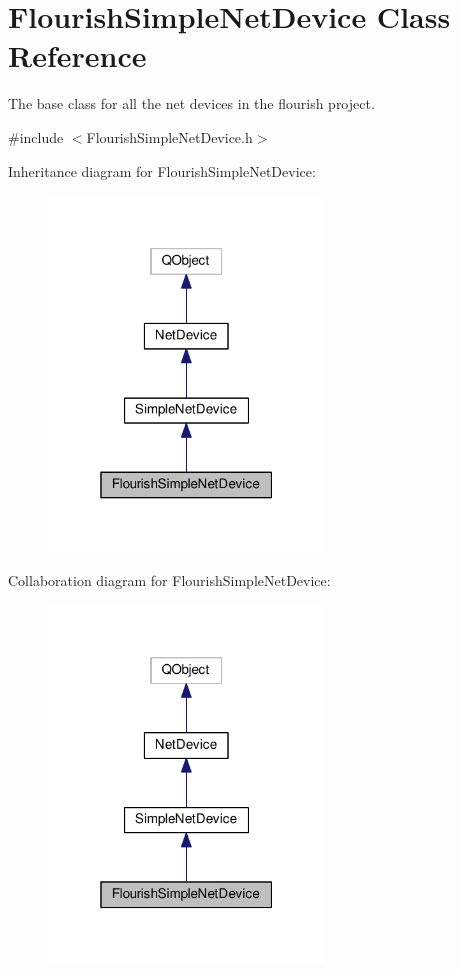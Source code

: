 \hypertarget{classFlourishSimpleNetDevice}{}\section{Flourish\+Simple\+Net\+Device Class Reference}
\label{classFlourishSimpleNetDevice}


The base class for all the net devices in the flourish project.  




{\ttfamily \#include $<$Flourish\+Simple\+Net\+Device.\+h$>$}



Inheritance diagram for Flourish\+Simple\+Net\+Device\+:\nopagebreak
\begin{figure}[H]
\begin{center}
\leavevmode
\includegraphics[width=208pt]{classFlourishSimpleNetDevice__inherit__graph}
\end{center}
\end{figure}


Collaboration diagram for Flourish\+Simple\+Net\+Device\+:\nopagebreak
\begin{figure}[H]
\begin{center}
\leavevmode
\includegraphics[width=208pt]{classFlourishSimpleNetDevice__coll__graph}
\end{center}
\end{figure}
